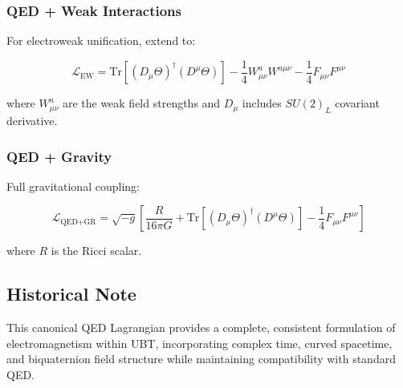 \subsubsection{QED + Weak Interactions}

For electroweak unification, extend to:

\begin{equation}
\mathcal{L}_{\text{EW}} = \text{Tr}[(D_\mu\Theta)^\dagger(D^\mu\Theta)] - \frac{1}{4}W_{\mu\nu}^a W^{a\mu\nu} - \frac{1}{4}F_{\mu\nu}F^{\mu\nu}
\end{equation}

where $W_{\mu\nu}^a$ are the weak field strengths and $D_\mu$ includes $SU(2)_L$ covariant derivative.

\subsubsection{QED + Gravity}

Full gravitational coupling:

\begin{equation}
\mathcal{L}_{\text{QED+GR}} = \sqrt{-g}\left[\frac{R}{16\pi G} + \text{Tr}[(D_\mu\Theta)^\dagger(D^\mu\Theta)] - \frac{1}{4}F_{\mu\nu}F^{\mu\nu}\right]
\end{equation}

where $R$ is the Ricci scalar.

\subsection{Historical Note}

This canonical QED Lagrangian provides a complete, consistent formulation of electromagnetism within UBT, incorporating complex time, curved spacetime, and biquaternion field structure while maintaining compatibility with standard QED.

